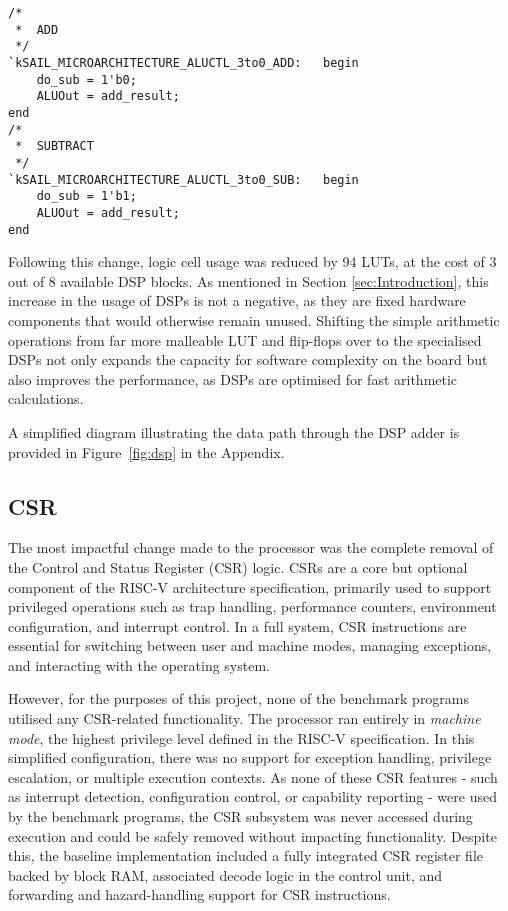 \documentclass[a4paper,10pt]{article}
\begin{document}
\begin{lstlisting}[style=verilog-style, caption=
    {is\_sub implementation within alu.v}, label={prog:alu}]
/*
 *	ADD
 */
`kSAIL_MICROARCHITECTURE_ALUCTL_3to0_ADD:	begin
	do_sub = 1'b0;
	ALUOut = add_result;
end
/*
 *	SUBTRACT
 */
`kSAIL_MICROARCHITECTURE_ALUCTL_3to0_SUB:	begin
	do_sub = 1'b1;
	ALUOut = add_result;
end
\end{lstlisting}

Following this change, logic cell usage was reduced by 94 LUTs, 
at the cost of 3 out of 8 available DSP blocks. 
As mentioned in Section \ref{sec:Introduction},
this increase in the usage of DSPs is not a negative,
as they are fixed hardware components
that would otherwise remain unused.
Shifting the simple arithmetic operations from 
far more malleable LUT and flip-flops over to the specialised DSPs
not only expands the capacity for software complexity on the board
but also improves the performance,
as DSPs are optimised for fast arithmetic calculations.

A simplified diagram illustrating the data path through the DSP adder 
is provided in Figure~\ref{fig:dsp} in the Appendix.

\subsection{CSR}
\label{sec:CSR}

The most impactful change made to the processor was the complete removal of the 
Control and Status Register (CSR) logic. 
CSRs are a core but optional component of the RISC-V architecture specification, 
primarily used to support privileged operations such as 
trap handling, performance counters, environment configuration, and interrupt control. 
In a full system, CSR instructions are essential for switching between user and machine 
modes, managing exceptions, 
and interacting with the operating system. \cite{CSR}

However, for the purposes of this project, none of the benchmark programs utilised 
any CSR-related functionality. 
The processor ran entirely in \textit{machine mode}, 
the highest privilege level defined in the RISC-V specification. 
In this simplified configuration, 
there was no support for exception handling, privilege escalation, 
or multiple execution contexts. 
As none of these CSR features - 
such as interrupt detection, configuration control, or capability reporting - 
were used by the benchmark programs, 
the CSR subsystem was never accessed during execution 
and could be safely removed without impacting functionality.
Despite this, the baseline implementation included a fully 
integrated CSR register file backed by block RAM, associated decode logic in the 
control unit, and forwarding and hazard-handling support for CSR instructions.
\end{document}
